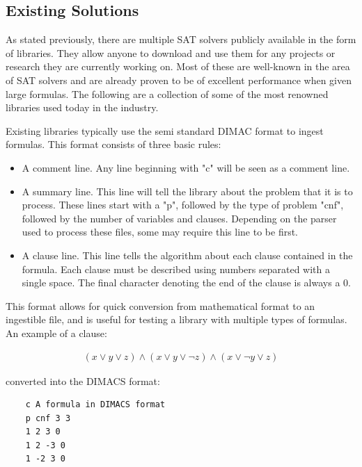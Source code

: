 \documentclass{article}
\begin{document}
\subsection{Existing Solutions}
As stated previously, there are multiple SAT solvers publicly available in the form of libraries. They allow anyone to download and use them
for any projects or research they are currently working on. Most of these are well-known in the area of SAT solvers and are already proven
to be of excellent performance when given large formulas. The following are a collection of some of the most renowned libraries used today
in the industry.

Existing libraries typically use the semi standard DIMAC format to ingest formulas. This format consists of three basic rules:

\begin{itemize}
    \item A comment line. Any line beginning with "c" will be seen as a comment line.
    \item A summary line. This line will tell the library about the problem that it is to process. These lines start with a "p", followed by
          the type of problem "cnf", followed by the number of variables and clauses. Depending on the parser used to process these files,
          some may require this line to be first.
    \item A clause line. This line tells the algorithm about each clause contained in the formula. Each clause must be described using
          numbers separated with a single space. The final character denoting the end of the clause is always a 0.
\end{itemize}

This format allows for quick conversion from mathematical format to an ingestible file, and is useful for testing a library with multiple
types of formulas. An example of a clause:

\begin{gather*}
    (x\vee y\vee z)\wedge (x\vee y\vee \neg z)\wedge (x\vee \neg y\vee z)
\end{gather*}

converted into the DIMACS format:

\begin{lstlisting}
    c A formula in DIMACS format
    p cnf 3 3
    1 2 3 0
    1 2 -3 0
    1 -2 3 0
\end{lstlisting}
\end{document}
